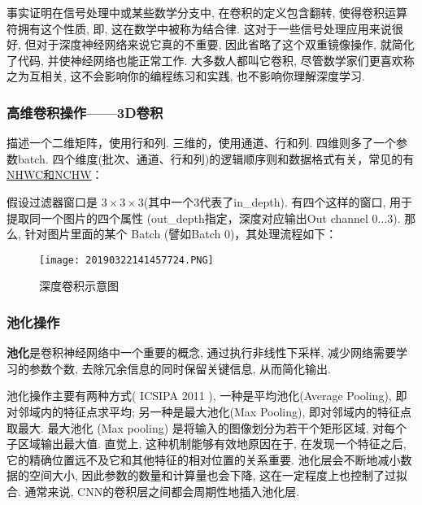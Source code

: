 事实证明在信号处理中或某些数学分支中, 在卷积的定义包含翻转, 使得卷积运算符拥有这个性质, 即, 这在数学中被称为结合律.
这对于一些信号处理应用来说很好, 但对于深度神经网络来说它真的不重要, 因此省略了这个双重镜像操作, 就简化了代码, 并使神经网络也能正常工作.
大多数人都叫它卷积, 尽管数学家们更喜欢称之为互相关, 这不会影响你的编程练习和实践, 也不影响你理解深度学习.
\subsubsection{高维卷积操作——3D卷积}
描述一个二维矩阵，使用行和列. 三维的，使用通道、行和列. 四维则多了一个参数batch.
四个维度(批次、通道、行和列)的逻辑顺序则和数据格式有关，常见的有 \href{https://mp.weixin.qq.com/s/I4Q1Bv7yecqYXUra49o7tw?}{NHWC和NCHW}：

假设过滤器窗口是 $3\times 3\times 3$(其中一个3代表了in\_depth).
有四个这样的窗口,
用于提取同一个图片的四个属性 (out\_depth指定，深度对应输出Out channel 0...3).
那么, 针对图片里面的某个 Batch (譬如Batch 0)，其处理流程如下：
\begin{figure}[H]
\centering
\texttt{[image: 20190322141457724.PNG]}
\caption{深度卷积示意图}
\label{20190322141457724}
\vspace{-0.4cm}
\end{figure}
\vspace{-0.4cm}
\subsubsection{池化操作}
\textbf{池化}是卷积神经网络中一个重要的概念, 通过执行非线性下采样, 减少网络需要学习的参数个数, 去除冗余信息的同时保留关键信息, 从而简化输出.

池化操作主要有两种方式( ICSIPA 2011 \cite{Nagi2011-6144164}), 一种是平均池化(Average Pooling), 即对邻域内的特征点求平均; 另一种是最大池化(Max Pooling), 即对邻域内的特征点取最大.
最大池化 (Max pooling) 是将输入的图像划分为若干个矩形区域, 对每个子区域输出最大值.
直觉上, 这种机制能够有效地原因在于, 在发现一个特征之后, 它的精确位置远不及它和其他特征的相对位置的关系重要.
池化层会不断地减小数据的空间大小, 因此参数的数量和计算量也会下降, 这在一定程度上也控制了过拟合.
通常来说, CNN的卷积层之间都会周期性地插入池化层.

